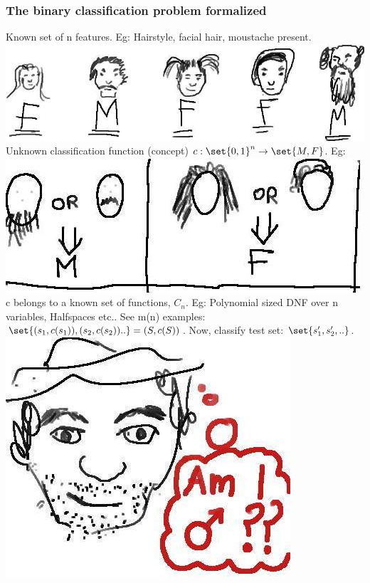 \documentclass{beamer}
\begin{document}
\begin{frame}
\frametitle{The binary classification problem formalized}
\begin{itemize}
 \pitem Known set of n features. Eg: Hairstyle, facial hair, moustache present.
\includegraphics[scale=0.15]{images/classifiedFaces.jpg}
 \pitem Unknown classification function (concept) $c: \set{0,1}^{n} \to \set{M,F}$. Eg: \includegraphics[scale=0.15]{images/concepts.jpg}
 \pitem c belongs to a known set of functions, $C_{n}$. Eg: Polynomial sized DNF over n variables, Halfspaces etc.. 
\pitem See m(n) examples: $\set{(s_{1}, c(s_{1})), (s_{2}, c(s_{2})) .. } = (S, c(S))$.
 \pitem Now, classify test set: $\set{s'_{1}, s'_{2}, ..}$. \includegraphics[scale=0.065]{images/maleFace.jpg}
\end{itemize}
\end{frame}
\end{document}
